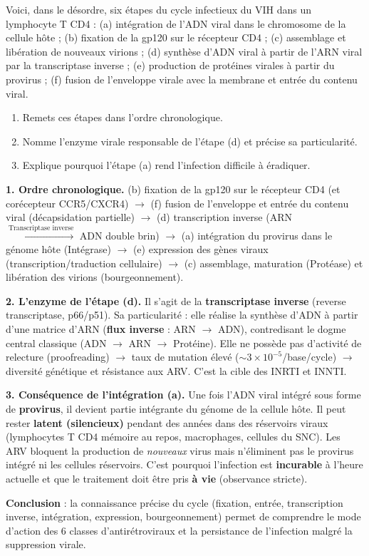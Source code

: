 \documentclass[11pt]{article}
\newcommand{\cle}[1]{{\popxbold\color{popdark}#1}}
\begin{document}
\begin{exoresolu}
Voici, dans le désordre, six étapes du cycle infectieux du VIH dans un lymphocyte T CD4 :
(a) intégration de l'ADN viral dans le chromosome de la cellule hôte ; (b) fixation de la gp120 sur le récepteur CD4 ; (c) assemblage et libération de nouveaux virions ; (d) synthèse d'ADN viral à partir de l'ARN viral par la transcriptase inverse ; (e) production de protéines virales à partir du provirus ; (f) fusion de l'enveloppe virale avec la membrane et entrée du contenu viral.
\begin{enumerate}
\item Remets ces étapes dans l'ordre chronologique.
\item Nomme l'enzyme virale responsable de l'étape (d) et précise sa particularité.
\item Explique pourquoi l'étape (a) rend l'infection difficile à éradiquer.
\end{enumerate}
\tcblower
\textbf{1. Ordre chronologique.}
(b) fixation de la gp120 sur le récepteur CD4 (et corécepteur CCR5/CXCR4) $\rightarrow$ (f) fusion de l'enveloppe et entrée du contenu viral (décapsidation partielle) $\rightarrow$ (d) transcription inverse (ARN $\xrightarrow{\text{Transcriptase inverse}}$ ADN double brin) $\rightarrow$ (a) intégration du provirus dans le génome hôte (Intégrase) $\rightarrow$ (e) expression des gènes viraux (transcription/traduction cellulaire) $\rightarrow$ (c) assemblage, maturation (Protéase) et libération des virions (bourgeonnement).

\textbf{2. L'enzyme de l'étape (d).}
Il s'agit de la \textbf{transcriptase inverse} (reverse transcriptase, p66/p51). Sa particularité : elle réalise la synthèse d'ADN à partir d'une matrice d'ARN (\textbf{flux inverse} : ARN $\rightarrow$ ADN), contredisant le dogme central classique (ADN $\rightarrow$ ARN $\rightarrow$ Protéine). Elle ne possède pas d'activité de relecture (proofreading) $\rightarrow$ taux de mutation élevé ($\sim 3 \times 10^{-5}$/base/cycle) $\rightarrow$ diversité génétique et résistance aux ARV. C'est la cible des INRTI et INNTI.

\textbf{3. Conséquence de l'intégration (a).}
Une fois l'ADN viral intégré sous forme de \textbf{provirus}, il devient partie intégrante du génome de la cellule hôte. Il peut rester \textbf{latent (silencieux)} pendant des années dans des \cle{réservoirs viraux} (lymphocytes T CD4 mémoire au repos, macrophages, cellules du SNC). Les ARV bloquent la production de \emph{nouveaux} virus mais n'éliminent pas le provirus intégré ni les cellules réservoirs. C'est pourquoi l'infection est \textbf{incurable} à l'heure actuelle et que le traitement doit être pris \textbf{à vie} (observance stricte).

\textbf{Conclusion} : la connaissance précise du cycle (fixation, entrée, transcription inverse, intégration, expression, bourgeonnement) permet de comprendre le mode d'action des 6 classes d'antirétroviraux et la persistance de l'infection malgré la suppression virale.
\end{exoresolu}
\end{document}
